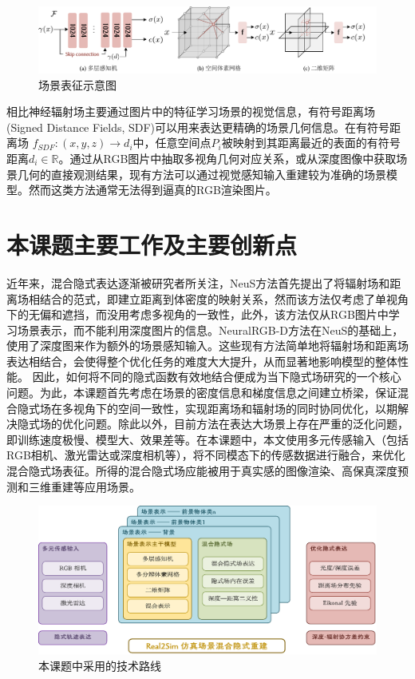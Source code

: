 \begin{figure}[t]
    \centering
    \includegraphics[width=\textwidth]{undergraduate-thesis/images/Scene Representations.pdf}
    \caption{场景表征示意图}
    \label{fig:scene-representation}
\end{figure}

相比神经辐射场主要通过图片中的特征学习场景的视觉信息，有符号距离场(Signed Distance Fields, SDF)可以用来表达更精确的场景几何信息。在有符号距离场 $f_{SDF}:(x,y,z)→d_i$中，任意空间点$P_i$被映射到其距离最近的表面的有符号距离$d_i\in \mathbb{R}$。通过从RGB图片中抽取多视角几何对应关系，或从深度图像中获取场景几何的直接观测结果，现有方法可以通过视觉感知输入重建较为准确的场景模型。然而这类方法通常无法得到逼真的RGB渲染图片。

\section{本课题主要工作及主要创新点}

近年来，混合隐式表达逐渐被研究者所关注，NeuS\cite{wang_neus_2021}方法首先提出了将辐射场和距离场相结合的范式，即建立距离到体密度的映射关系，然而该方法仅考虑了单视角下的无偏和遮挡，而没用考虑多视角的一致性，此外，该方法仅从RGB图片中学习场景表示，而不能利用深度图片的信息。NeuralRGB-D\cite{azinovic_neural_2022}方法在NeuS的基础上，使用了深度图来作为额外的场景感知输入。这些现有方法简单地将辐射场和距离场表达相结合，会使得整个优化任务的难度大大提升，从而显著地影响模型的整体性能。 因此，如何将不同的隐式函数有效地结合便成为当下隐式场研究的一个核心问题。为此，本课题首先考虑在场景的密度信息和梯度信息之间建立桥梁，保证混合隐式场在多视角下的空间一致性，实现距离场和辐射场的同时协同优化，以期解决隐式场的优化问题。除此以外，目前方法在表达大场景上存在严重的泛化问题，即训练速度极慢、模型大、效果差等。在本课题中，本文使用多元传感输入（包括RGB相机、激光雷达或深度相机等），将不同模态下的传感数据进行融合，来优化混合隐式场表征。所得的混合隐式场应能被用于真实感的图像渲染、高保真深度预测和三维重建等应用场景。


\begin{figure}[t]
    \centering
    \includegraphics[width=\textwidth]{undergraduate-thesis/images/method.pdf}
    \caption{本课题中采用的技术路线}
    \label{fig:method}
\end{figure}

